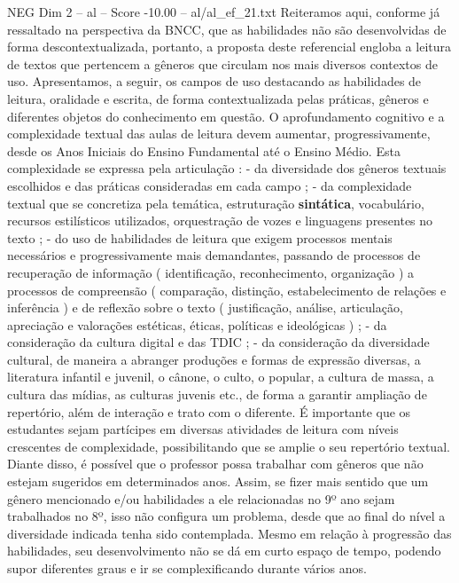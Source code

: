 \begin{textsample}{NEG Dim 2 – al – Score -10.00 – al/al\_ef\_21.txt}  \label{ex:f2_neg_021}
Reiteramos aqui, conforme já ressaltado na perspectiva da BNCC, que as habilidades não são desenvolvidas de forma descontextualizada, portanto, a proposta deste referencial engloba a leitura de textos que pertencem a gêneros que circulam nos mais diversos contextos de uso.
Apresentamos, a seguir, os campos de uso destacando as habilidades de leitura, oralidade e escrita, de forma contextualizada pelas práticas, gêneros e diferentes objetos do conhecimento em questão.
O aprofundamento cognitivo e a complexidade textual das aulas de leitura devem aumentar, progressivamente, desde os Anos Iniciais do Ensino Fundamental até o Ensino Médio.
Esta complexidade se expressa pela articulação : - da diversidade dos gêneros textuais escolhidos e das práticas consideradas em cada campo ; - da complexidade textual que se concretiza pela temática, estruturação \textbf{sintática}, vocabulário, recursos estilísticos utilizados, orquestração de vozes e linguagens presentes no texto ; - do uso de habilidades de leitura que exigem processos mentais necessários e progressivamente mais demandantes, passando de processos de recuperação de informação ( identificação, reconhecimento, organização ) a processos de compreensão ( comparação, distinção, estabelecimento de relações e inferência ) e de reflexão sobre o texto ( justificação, análise, articulação, apreciação e valorações estéticas, éticas, políticas e ideológicas ) ; - da consideração da cultura digital e das TDIC ; - da consideração da diversidade cultural, de maneira a abranger produções e formas de expressão diversas, a literatura infantil e juvenil, o cânone, o culto, o popular, a cultura de massa, a cultura das mídias, as culturas juvenis etc., de forma a garantir ampliação de repertório, além de interação e trato com o diferente.
É importante que os estudantes sejam partícipes em diversas atividades de leitura com níveis crescentes de complexidade, possibilitando que se amplie o seu repertório textual.
Diante disso, é possível que o professor possa trabalhar com gêneros que não estejam sugeridos em determinados anos.
Assim, se fizer mais sentido que um gênero mencionado e/ou habilidades a ele relacionadas no 9º ano sejam trabalhados no 8º, isso não configura um problema, desde que ao final do nível a diversidade indicada tenha sido contemplada.
Mesmo em relação à progressão das habilidades, seu desenvolvimento não se dá em curto espaço de tempo, podendo supor diferentes graus e ir se complexificando durante vários anos.

\end{textsample}
